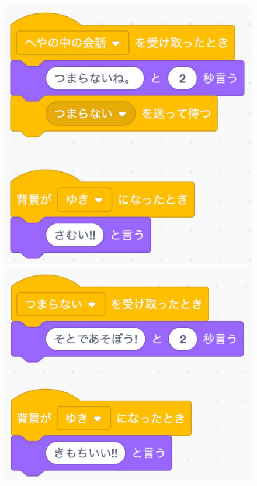 \documentclass[10pt,a4j]{ltjsarticle}
\begin{document}
\begin{figure}[H]
  \begin{minipage}[b]{0.33\linewidth}
    \centering
    \includegraphics[keepaspectratio, scale=0.3]{images/sample02-1.pdf}
  \end{minipage}
  \begin{minipage}[b]{0.33\linewidth}
    \centering
    \includegraphics[keepaspectratio, scale=0.3]{images/sample02-3.pdf}

\end{minipage}
\end{figure}
\end{document}
